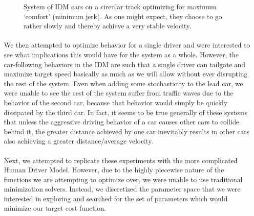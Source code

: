 \documentclass[12pt]{article}
\begin{document}
\begin{figure}[H]
  \centering
  \caption{System of IDM cars on a circular track optimizing for maximum `comfort' (minimum jerk). As one might expect, they choose to go rather slowly and thereby achieve a very stable velocity.}
\end{figure}


\paragraph{}We then attempted to optimize behavior for a single driver and were interested to see what implications this would have for the system as a whole. However, the car-following behaviors in the IDM are such that a single driver can tailgate and maximize target speed basically as much as we will allow without ever disrupting the rest of the system. Even when adding some stochasticity to the lead car, we were unable to see the rest of the system suffer from traffic waves due to the behavior of the second car, because that behavior would simply be quickly dissipated by the third car. In fact, it seems to be true generally of these systems that unless the aggressive driving behavior of a car causes other cars to collide behind it, the greater distance achieved by one car inevitably results in other cars also achieving a greater distance/average velocity.
\paragraph{}Next, we attempted to replicate these experiments with the more complicated Human Driver Model. However, due to the highly piecewise nature of the functions we are attempting to optimize over, we were unable to use traditional minimization solvers. Instead, we discretized the parameter space that we were interested in exploring and searched for the set of parameters which would minimize our target cost function.
\end{document}
